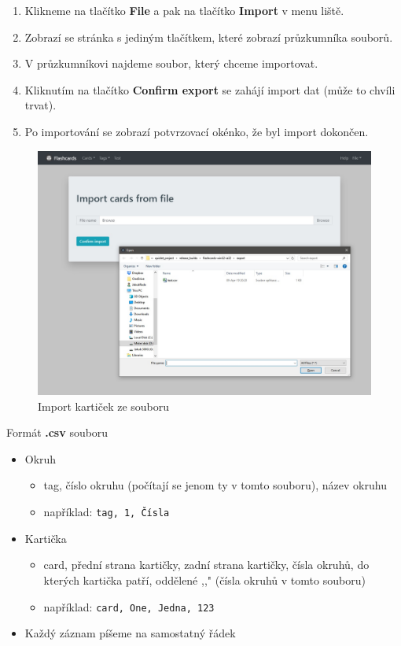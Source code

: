 \documentclass[11pt]{article}
\providecommand{\tightlist}{\setlength{\itemsep}{1pt}\setlength{\parskip}{1pt}}
\let\oldtexttt\texttt
\renewcommand{\texttt}[1]{\oldtexttt{\textcolor{codehighlight}{#1}}}
\begin{document}
\begin{enumerate}
\def\labelenumi{\arabic{enumi}.}
\tightlist
\item
  Klikneme na tlačítko \textbf{File} a pak na tlačítko \textbf{Import} v
  menu liště.
\item
  Zobrazí se stránka s jediným tlačítkem, které zobrazí průzkumníka
  souborů.
\item
  V průzkumníkovi najdeme soubor, který chceme importovat.
\item
  Kliknutím na tlačítko \textbf{Confirm export} se zahájí import dat
  (může to chvíli trvat).
\item
  Po importování se zobrazí potvrzovací okénko, že byl import dokončen.
\end{enumerate}

\begin{figure}
\centering
\includegraphics{assets/import.jpg}
\caption{Import kartiček ze souboru}
\end{figure}

Formát \textbf{.csv} souboru

\begin{itemize}
\tightlist
\item
  Okruh

  \begin{itemize}
  \tightlist
  \item
    tag, číslo okruhu (počítají se jenom ty v tomto souboru), název
    okruhu
  \item
    například: \texttt{tag,\ 1,\ Čísla}
  \end{itemize}
\item
  Kartička

  \begin{itemize}
  \tightlist
  \item
    card, přední strana kartičky, zadní strana kartičky, čísla okruhů,
    do kterých kartička patří, oddělené ,,\textbar{}" (čísla okruhů v
    tomto souboru)
  \item
    například: \texttt{card,\ One,\ Jedna,\ 1\textbar{}2\textbar{}3}
  \end{itemize}
\item
  Každý záznam píšeme na samostatný řádek
\end{itemize}
\end{document}
